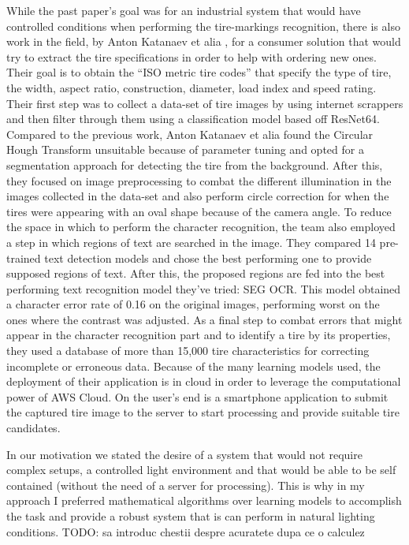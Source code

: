 While the past paper's goal was for an industrial system that would have controlled conditions when performing the tire-markings recognition, there is also work in the field, by Anton Katanaev et alia \cite{site:0}, for a consumer solution that would try to extract the tire specifications in order to help with ordering new ones. Their goal is to obtain the “ISO metric tire codes” that specify the type of tire, the width, aspect ratio, construction, diameter, load index and speed rating. Their first step was to collect a data-set of tire images by using internet scrappers and then filter through them using a classification model based off ResNet64. Compared to the previous work, Anton Katanaev et alia found the Circular Hough Transform unsuitable because of parameter tuning and opted for a segmentation approach for detecting the tire from the background. After this, they focused on image preprocessing to combat the different illumination in the images collected in the data-set and also perform circle correction for when the tires were appearing with an oval shape because of the camera angle. To reduce the space in which to perform the character recognition, the team also employed a step in which regions of text are searched in the image. They compared 14 pre-trained text detection models and chose the best performing one to provide supposed regions of text. After this, the proposed regions are fed into the best performing text recognition model they've tried: SEG OCR. This model obtained a character error rate of 0.16 on the original images, performing worst on the ones where the contrast was adjusted. As a final step to combat errors that might appear in the character recognition part and to identify a tire by its properties, they used a database of more than 15,000 tire characteristics for correcting incomplete or erroneous data. Because of the many learning models used, the deployment of their application is in cloud in order to leverage the computational power of AWS Cloud. On the user's end is a smartphone application to submit the captured tire image to the server to start processing and provide suitable tire candidates.

In our motivation we stated the desire of a system that would not require complex setups, a controlled light environment and that would be able to be self contained (without the need of a server for processing). This is why in my approach I preferred mathematical algorithms over learning models to accomplish the task and provide a robust system that is can perform in natural lighting conditions. TODO: sa introduc chestii despre acuratete dupa ce o calculez